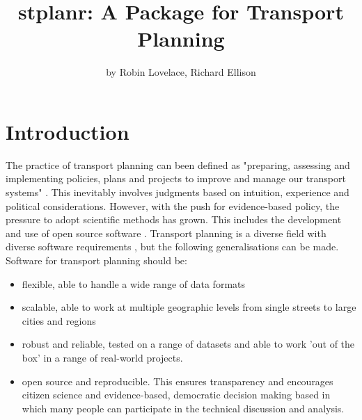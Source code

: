 \title{stplanr: A Package for Transport Planning}
\author{by Robin Lovelace, Richard Ellison}

\maketitle


\section{Introduction}\label{introduction}

The practice of transport planning can been defined as
"preparing, assessing and implementing policies, plans and projects to
improve and manage our transport systems"
\citep{jones_road_2014}.
This inevitably involves judgments based on intuition, experience and political considerations.
However, with the push for evidence-based policy, the pressure to adopt scientific methods has grown.
This includes the development and use of open source software \citep{balmer_matsim-t:_2009}.
Transport planning is a diverse field with diverse software requirements \citep{boyce_forecasting_2015}, but the following generalisations can be made.
Software for transport planning should be:

\begin{itemize}
\tightlist
\item
  flexible, able to handle a wide range of data formats
\item
  scalable, able to work at multiple geographic levels from single streets to large cities and regions
\item
  robust and reliable, tested on a range of datasets and able to work 'out of the box' in a range of real-world projects.
\item
  open source and reproducible. This ensures transparency and encourages citizen science and evidence-based, democratic decision making based in which many people can participate in the technical discussion and analysis.
\end{itemize}

